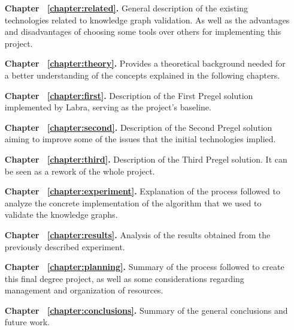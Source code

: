 \begin{itemize}
    \item[\textbf{Chapter ~\ref{chapter:related}.}] General description of the existing technologies related to knowledge graph validation. As well as the advantages and disadvantages of choosing some tools over others for implementing this project.
    \item[\textbf{Chapter ~\ref{chapter:theory}.}] Provides a theoretical background needed for a better understanding of the concepts explained in the following chapters.
    \item[\textbf{Chapter ~\ref{chapter:first}.}] Description of the First Pregel solution implemented by Labra, serving as the project's baseline.
    \item[\textbf{Chapter ~\ref{chapter:second}.}] Description of the Second Pregel solution aiming to improve some of the issues that the initial technologies implied.
    \item[\textbf{Chapter ~\ref{chapter:third}.}] Description of the Third Pregel solution. It can be seen as a rework of the whole project.
    \item[\textbf{Chapter ~\ref{chapter:experiment}.}] Explanation of the process followed to analyze the concrete implementation of the algorithm that we used to validate the knowledge graphs.
    \item[\textbf{Chapter ~\ref{chapter:results}.}] Analysis of the results obtained from the previously described experiment.
    \item[\textbf{Chapter ~\ref{chapter:planning}.}] Summary of the process followed to create this final degree project, as well as some considerations regarding management and organization of resources.
    \item[\textbf{Chapter ~\ref{chapter:conclusions}.}] Summary of the general conclusions and future work.
\end{itemize}